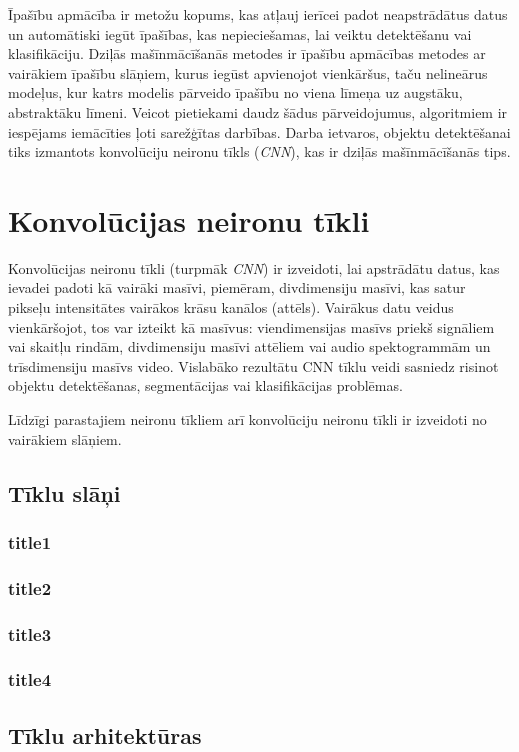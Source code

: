 \documentclass[12pt,paper=a4]{report}
\begin{document}
Īpašību apmācība ir metožu kopums, kas atļauj ierīcei padot neapstrādātus datus un automātiski iegūt īpašības, kas nepieciešamas, lai veiktu detektēšanu vai klasifikāciju. Dziļās mašīnmācīšanās metodes ir īpašību apmācības metodes ar vairākiem īpašību slāņiem, kurus iegūst apvienojot vienkāršus, taču nelineārus modeļus, kur katrs modelis pārveido īpašību no viena līmeņa uz augstāku, abstraktāku līmeni. Veicot pietiekami daudz šādus pārveidojumus, algoritmiem ir iespējams iemācīties ļoti sarežģītas darbības.\cite{deepnet} Darba ietvaros, objektu detektēšanai tiks izmantots konvolūciju neironu tīkls (\textit{CNN}), kas ir dziļās mašīnmācīšanās tips.

\section{Konvolūcijas neironu tīkli}
Konvolūcijas neironu tīkli (turpmāk \textit{CNN}) ir izveidoti, lai apstrādātu datus, kas ievadei padoti kā vairāki masīvi, piemēram, divdimensiju masīvi, kas satur pikseļu intensitātes vairākos krāsu kanālos (attēls). Vairākus datu veidus vienkāršojot, tos var izteikt kā masīvus: viendimensijas masīvs priekš signāliem vai skaitļu rindām, divdimensiju masīvi attēliem vai audio spektogrammām un trīsdimensiju masīvs video. Vislabāko rezultātu CNN tīklu veidi sasniedz risinot objektu detektēšanas, segmentācijas vai klasifikācijas problēmas.

Līdzīgi parastajiem neironu tīkliem arī konvolūciju neironu tīkli ir izveidoti no vairākiem slāņiem.

\subsection{Tīklu slāņi}
\subsubsection{title1}
\subsubsection{title2}
\subsubsection{title3}
\subsubsection{title4}
\subsection{Tīklu arhitektūras}
\end{document}
